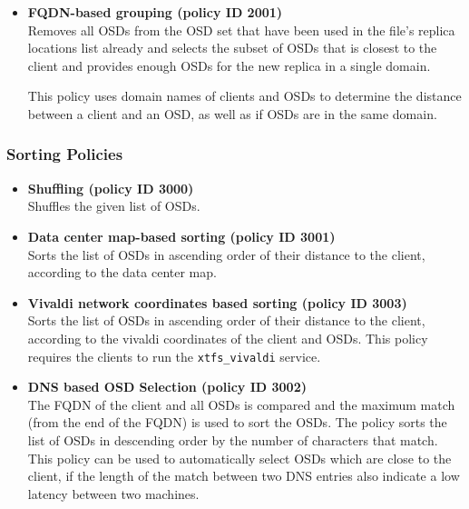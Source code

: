 \documentclass[a4paper,10pt]{book}
\begin{document}
\begin{itemize}
 \item \textbf{FQDN-based grouping (policy ID 2001)}\\
 Removes all OSDs from the OSD set that have been used in the file's replica locations list already and selects the subset of OSDs that is closest to the client and provides enough OSDs for the new replica in a single domain.

This policy uses domain names of clients and OSDs to determine the distance between a client and an OSD, as well as if OSDs are in the same domain.

\end{itemize}

\subsubsection{Sorting Policies}

\begin{itemize}

 \item \textbf{Shuffling (policy ID 3000)}\\
 Shuffles the given list of OSDs.

 \item \textbf{Data center map-based sorting (policy ID 3001)}\\
 Sorts the list of OSDs in ascending order of their distance to the client, according to the data center map.

 \item \textbf{Vivaldi network coordinates based sorting (policy ID 3003)}\\
 Sorts the list of OSDs in ascending order of their distance to the client, according to the vivaldi coordinates of the client and OSDs. This policy requires the clients to run the \texttt{xtfs\_vivaldi} service.

 \item \textbf{DNS based OSD Selection (policy ID 3002)}\\
 The FQDN of the client and all OSDs is compared and the maximum match (from the end of the FQDN) is used to sort the OSDs. The policy sorts the list of OSDs in descending order by the number of characters that match. This policy can be used to automatically select OSDs which are close to the client, if the length of the match between two DNS entries also indicate a low latency between two machines.

\end{itemize}
\end{document}
